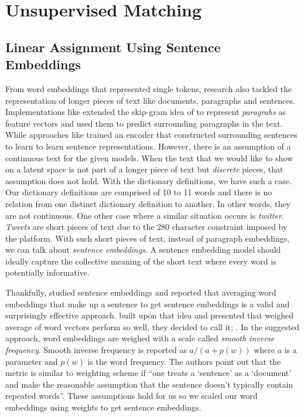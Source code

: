 \chapter{Unsupervised Matching}%
\label{chap:unsupervised_matching}


\section{Linear Assignment Using Sentence Embeddings}%
\label{sec:linear_assignment_using_sentence_embeddings}
From word embeddings that represented single tokens, research also tackled the representation of longer pieces of text like documents, paragraphs and sentences.
Implementations like \textcite{le_distributed_2014} extended the skip-gram idea of \textcite{mikolov_distributed_2013} to represent \emph{paragrahs} as feature vectors and used them to predict surrounding paragraphs in the text.
While approaches like \textcite{kiros_skip-thought_2015} trained an encoder that constructed surrounding sentences to learn to learn sentence representations.
However, there is an assumption of a continuous text for the given models.
When the text that we would like to show on a latent space is not part of a longer piece of text but \emph{discrete} pieces, that assumption does not hold.
With the dictionary definitions, we have such a case.
Our dictionary definitions are comprised of 10 to 11 words and there is no relation from one distinct dictionary definition to another.
In other words, they are not continuous.
One other case where a similar situation occurs is \emph{twitter}.
\emph{Tweets} are short pieces of text due to the 280 character constraint imposed by the platform.
With such short pieces of text, instead of paragraph embeddings, we can talk about \emph{sentence embeddings}.
A sentence embedding model should ideally capture the collective meaning of the short text where every word is potentially informative.

Thankfully, \textcite{wieting_towards_2015} studied sentence embeddings and reported that averaging word embeddings that make up a sentence to get sentence embeddings is a valid and surprisingly effective approach.
\textcite{arora_simple_2016} built upon that idea and presented that weighed average of word vectors perform so well, they decided to call it; .
In the suggested approach, word embeddings are weighed with a scale called \emph{smooth inverse frequency}.
Smooth inverse frequency is reported as $a/(a + p(w))$ where $a$ is a parameter and $p(w)$ is the word frequency.
The authors point out that the metric is similar to \tfidf{} weighting scheme if \enquote{one treats a \enquote{sentence} as a \enquote{document} and make the reasonable assumption that the sentence doesn't typically contain repeated words}.
These assumptions hold for us so we scaled our word embeddings using \tfidf{} weights to get sentence embeddings.

